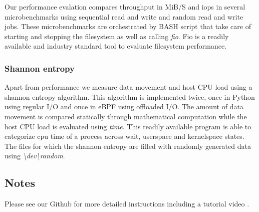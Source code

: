 Our performance evalation compares throughput in MiB/S and iops in several
microbenchmarks using sequential read and write and random read and write jobs.
These microbenchmarks are orchestrated by BASH script that take care of starting
and stopping the filesystem as well as calling \textit{fio}. Fio is a readily
available and industry standard tool to evaluate filesystem performance.

\subsubsection{Shannon entropy}

Apart from performance we measure data movement and host CPU load using a
shannon entropy algorithm. This algorithm is implemented twice, once in Python
using regular I/O and once in eBPF using offloaded I/O. The amount of data
movement is compared statically through mathematical computation while the host
CPU load is evaluated using \textit{time}. This readily available program is
able to categorize cpu time of a process across wait, userspace and kernelspace
states. The files for which the shannon entropy are filled with randomly
generated data using \textit{\textbackslash dev\textbackslash random}.

\subsection{Notes}

Please see our Github for more detailed instructions including a tutorial
video \cite{qemu-csd}.


